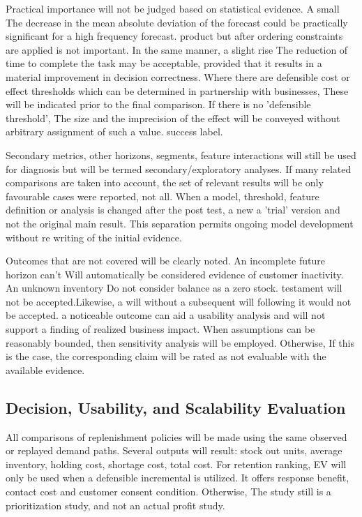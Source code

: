 \documentclass[a4paper,11pt,oneside]{book}
\theoremstyle{plain}
\theoremstyle{definition}
\theoremstyle{remark}
\begin{document}
Practical importance will not be judged based on statistical evidence. A small The decrease in the mean absolute deviation of the forecast could be practically significant for a high frequency forecast. product but after ordering constraints are applied is not important. In the same manner, a slight rise The reduction of time to complete the task may be acceptable, provided that it results in a material improvement in decision correctness. Where there are defensible cost or effect thresholds which can be determined in partnership with businesses, These will be indicated prior to the final comparison. If there is no 'defensible threshold', The size and the imprecision of the effect will be conveyed without arbitrary assignment of such a value. success label.

Secondary metrics, other horizons, segments, feature interactions will still be used for diagnosis but will be termed secondary/exploratory analyses. If many related comparisons are taken into account, the set of relevant results will be only favourable cases were reported, not all. When a model, threshold, feature definition or analysis is changed after the post test, a new a 'trial' version and not the original main result. This separation permits ongoing model development without re writing of the initial evidence.

Outcomes that are not covered will be clearly noted. An incomplete future horizon can't Will automatically be considered evidence of customer inactivity. An unknown inventory Do not consider balance as a zero stock. testament will not be accepted.Likewise, a will without a subsequent will following it would not be accepted. a noticeable outcome can aid a usability analysis and will not support a finding of realized business impact. When assumptions can be reasonably bounded, then sensitivity analysis will be employed. Otherwise, If this is the case, the corresponding claim will be rated as not evaluable with the available evidence.

\subsection{Decision, Usability, and Scalability Evaluation}
\label{subsec:decision_usability_scalability}

All comparisons of replenishment policies will be made using the same observed or replayed demand paths. Several outputs will result: stock out units, average inventory, holding cost, shortage cost, total cost. For retention ranking, EV will only be used when a defensible incremental is utilized. It offers response benefit, contact cost and customer consent condition. Otherwise, The study still is a prioritization study, and not an actual profit study.
\end{document}
